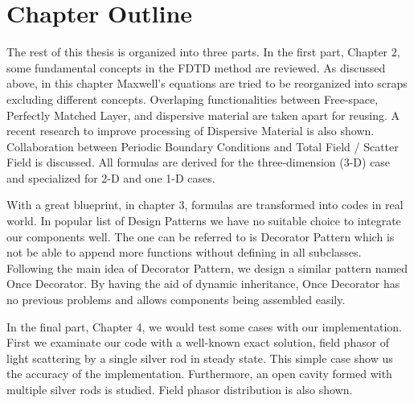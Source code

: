 \section{Chapter Outline}
The rest of this thesis is organized into three parts. In the first part, Chapter 2, some fundamental concepts in the FDTD method are
reviewed. As discussed above, in this chapter Maxwell's equations are tried to be reorganized into scraps excluding
different concepts. Overlaping functionalities between Free-space, Perfectly Matched Layer, and dispersive material are
taken apart for reusing. A recent research to improve processing of Dispersive Material is also shown. Collaboration
between Periodic Boundary Conditions and Total Field / Scatter Field is discussed. All formulas are derived for the
three-dimension (3-D) case and specialized for 2-D and one 1-D cases.

With a great blueprint, in chapter 3, formulas are transformed into codes in real world. In popular list of Design
Patterns we have no suitable choice to integrate our components well. The one can be referred to is Decorator Pattern
which is not be able to append more functions without defining in all subclasses. Following the main idea of Decorator
Pattern, we design a similar pattern named Once Decorator. By having the aid of dynamic inheritance, Once Decorator
has no previous problems and allows components being assembled easily.

In the final part, Chapter 4, we would test some cases with our implementation. First we examinate our code with a
well-known exact solution, field phasor of light scattering by a single silver rod in steady state. This simple case show us the accuracy of the
implementation. Furthermore, an open cavity formed with multiple silver rods is studied. Field phasor distribution is also
shown.

